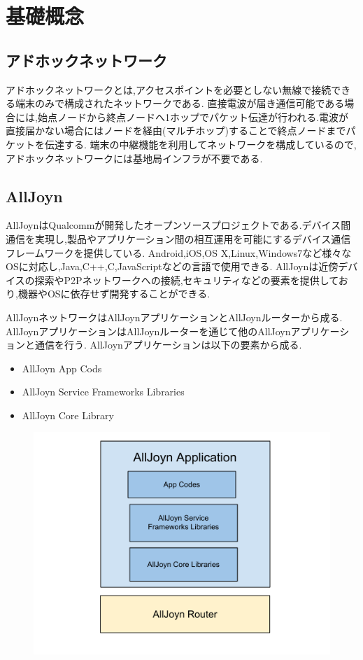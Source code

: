 \chapter{基礎概念}
\label{chap:concept}

\section{アドホックネットワーク}
アドホックネットワークとは,アクセスポイントを必要としない無線で接続できる端末のみで構成されたネットワークである.
直接電波が届き通信可能である場合には,始点ノードから終点ノードへ1ホップでパケット伝達が行われる.電波が直接届かない場合にはノードを経由(マルチホップ)することで終点ノードまでパケットを伝達する.
端末の中継機能を利用してネットワークを構成しているので,アドホックネットワークには基地局インフラが不要である.

\section{AllJoyn}
AllJoynはQualcommが開発したオープンソースプロジェクトである.デバイス間通信を実現し,製品やアプリケーション間の相互運用を可能にするデバイス通信フレームワークを提供している.
Android,iOS,OS X,Linux,Windows7など様々なOSに対応し,Java,C++,C,JavaScriptなどの言語で使用できる.
AllJoynは近傍デバイスの探索やP2Pネットワークへの接続,セキュリティなどの要素を提供しており,機器やOSに依存せず開発することができる.


AllJoynネットワークはAllJoynアプリケーションとAllJoynルーターから成る.
AllJoynアプリケーションはAllJoynルーターを通じて他のAllJoynアプリケーションと通信を行う.
AllJoynアプリケーションは以下の要素から成る.

\begin{itemize}
\item AllJoyn App Cods
\item AllJoyn Service Frameworks Libraries
\item AllJoyn Core Library
\end{itemize}

\begin{figure}
\centering
\includegraphics[width=15cm]{fig/AllJoyn.pdf}
\end{figure}

